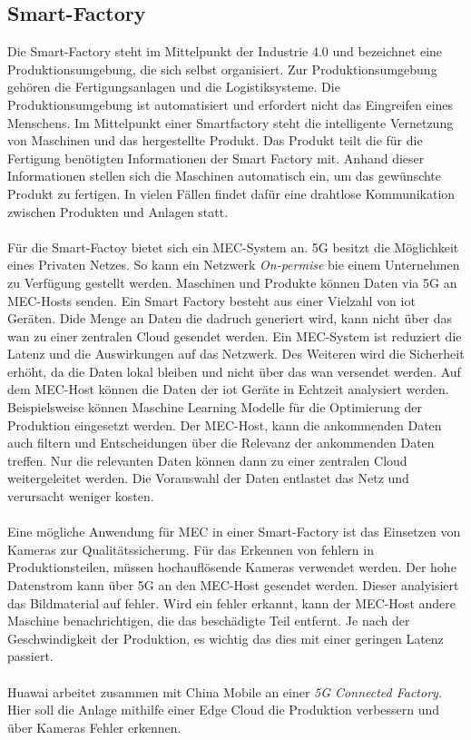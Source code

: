\documentclass[runningheads]{llncs}
\numberwithin{figure}{section}
\begin{document}
\subsection{Smart-Factory}
Die Smart-Factory steht im Mittelpunkt der Industrie 4.0 und bezeichnet eine Produktionsumgebung, die sich selbst organisiert. 
Zur Produktionsumgebung gehören die Fertigungsanlagen und die Logistiksysteme. Die Produktionsumgebung ist automatisiert und erfordert
nicht das Eingreifen eines Menschens. 
Im Mittelpunkt einer Smartfactory steht die intelligente Vernetzung von Maschinen und das hergestellte Produkt. 
Das Produkt teilt die für die Fertigung benötigten Informationen der Smart Factory mit. 
Anhand dieser Informationen stellen sich die Maschinen automatisch ein, um das gewünschte Produkt zu fertigen. 
In vielen Fällen findet dafür eine drahtlose Kommunikation zwischen Produkten und Anlagen statt.  \cite{gundall5GEnablerIndustrie2018}
\\
\\
Für die Smart-Factoy bietet sich ein MEC-System an. 5G besitzt die Möglichkeit eines Privaten Netzes. 
So kann ein Netzwerk \textit{On-permise} bie einem Unternehmen zu Verfügung gestellt werden. 
Maschinen und Produkte können Daten via 5G an MEC-Hosts senden.
Ein Smart Factory besteht aus einer Vielzahl von \acrfull{iot} Geräten. Dide Menge an Daten die dadruch 
generiert wird, kann nicht über das \acrshort{wan} zu einer zentralen Cloud gesendet werden. Ein MEC-System ist reduziert die Latenz
und die Auswirkungen auf das Netzwerk. Des Weiteren wird die Sicherheit erhöht, da die Daten lokal bleiben und nicht über 
das \acrshort{wan} versendet werden. Auf dem MEC-Host können die Daten der \acrshort{iot} Geräte in Echtzeit analysiert werden. Beispielsweise können
Maschine Learning Modelle für die Optimierung der Produktion eingesetzt werden. Der MEC-Host, kann die ankommenden Daten auch filtern und Entscheidungen über
die Relevanz der ankommenden Daten treffen. Nur die relevanten Daten können dann zu einer zentralen Cloud weitergeleitet werden. Die Vorauswahl der Daten entlastet
das Netz und verursacht weniger kosten.
\\
\\
Eine mögliche Anwendung für MEC in einer Smart-Factory ist das Einsetzen von Kameras zur Qualitätssicherung.
Für das Erkennen von fehlern in Produktionsteilen, müssen hochauflösende Kameras verwendet werden. Der hohe Datenstrom
kann über 5G an den MEC-Host gesendet werden. Dieser analyisiert das Bildmaterial auf fehler. Wird ein fehler erkannt,
kann der MEC-Host andere Maschine benachrichtigen, die das beschädigte Teil entfernt. Je nach der Geschwindigkeit der Produktion,
es wichtig das dies mit einer geringen Latenz passiert. \cite{etsiMultiaccessEdgeComputing}
\\
\\
Huawai arbeitet zusammen mit China Mobile an einer \textit{5G Connected Factory}. Hier soll die Anlage mithilfe 
einer Edge Cloud die Produktion verbessern und über Kameras Fehler erkennen. \cite{WhatNextgenFactory}
\end{document}
